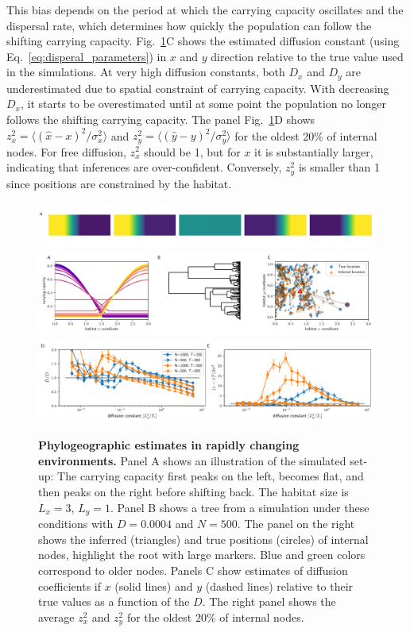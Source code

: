 \documentclass[aps,rmp, twocolumn]{revtex4}
\begin{document}
This bias depends on the period at which the carrying capacity oscillates and the dispersal rate, which determines how quickly the population can follow the shifting carrying capacity.
Fig.~\ref{fig:seasaw}C shows the estimated diffusion constant (using Eq.~\ref{eq:disperal_parameters}) in $x$ and $y$ direction relative to the true value used in the simulations.
At very high diffusion constants, both $D_x$ and $D_y$ are underestimated due to spatial constraint of carrying capacity.
With decreasing $D_x$, it starts to be overestimated until at some point the population no longer follows the shifting carrying capacity.
The panel Fig.~\ref{fig:seasaw}D shows $z_x^2 = \langle (\hat{x} - x)^2/\sigma_x^2 \rangle$ and $z_y^2=\langle (\hat{y} - y)^2/\sigma_y^2\rangle$ for the oldest 20\% of internal nodes.
For free diffusion, $z_x^2$ should be 1, but for $x$ it is substantially larger, indicating that inferences are over-confident.
Conversely, $z_y^2$ is smaller than 1 since positions are constrained by the habitat.

\begin{figure}
    \includegraphics[width=\textwidth]{figures/seasaw_illustration}
    \includegraphics[width=\textwidth]{figures/seasaw_example}
    \includegraphics[width=\textwidth]{figures/seasaw}
    \caption{\label{fig:seasaw} {\bf Phylogeographic estimates in rapidly changing environments.} Panel A shows an illustration of the simulated set-up: The carrying capacity first peaks on the left, becomes flat, and then peaks on the right before shifting back. The habitat size is $L_x=3$, $L_y=1$.
    Panel B shows a tree from a simulation under these conditions with $D=0.0004$ and $N=500$. The panel on the right shows the inferred (triangles) and true positions (circles) of internal nodes, highlight the root with large markers. Blue and green colors correspond to older nodes.
    Panels C show estimates of diffusion coefficients if $x$ (solid lines) and $y$ (dashed lines) relative to their true values as a function of the $D$. The right panel shows the average $z_x^2$ and $z_y^2$ for the oldest 20\% of internal nodes.}
\end{figure}
\end{document}
